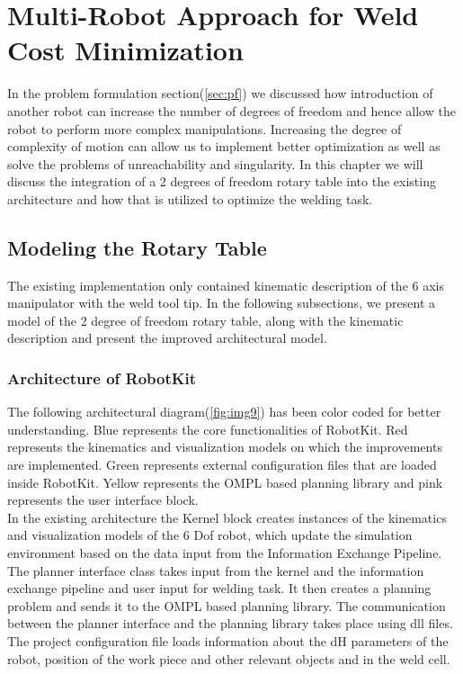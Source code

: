 \section{Multi-Robot Approach for Weld Cost Minimization}

In the problem formulation section(\ref{sec:pf}) we discussed how introduction of another robot can increase the number of degrees of freedom and hence allow the robot to perform more complex manipulations. Increasing the degree of complexity of motion can allow us to implement better optimization as well as solve the problems of unreachability and singularity. In this chapter we will discuss the integration of a 2 degrees of freedom rotary table into the existing architecture and how that is utilized to optimize the welding task. 

\subsection{Modeling the Rotary Table}
The existing implementation only contained kinematic description of the 6 axis manipulator with the weld tool tip. In the following subsections, we present a model of the 2 degree of freedom rotary table, along with the kinematic description and present the improved architectural model.
\subsubsection{Architecture of RobotKit}
The following architectural diagram(\ref{fig:img9}) has been color coded for better understanding. Blue represents the core functionalities of RobotKit. Red represents the kinematics and visualization models on which the improvements are implemented. Green represents external configuration files that are loaded inside RobotKit. Yellow represents the OMPL based planning library and pink represents the user interface block. \\
In the existing architecture the Kernel block creates instances of the kinematics and visualization models of the 6 Dof robot, which update the simulation environment based on the data input from the Information Exchange Pipeline. The planner interface class takes input from the kernel and the information exchange pipeline and user input for welding task. It then creates a planning problem and sends it to the OMPL based planning library. The communication between the planner interface and the planning library takes place using dll files. The project configuration file loads information about the dH parameters of the robot, position of the work piece and other relevant objects and in the weld cell. 


